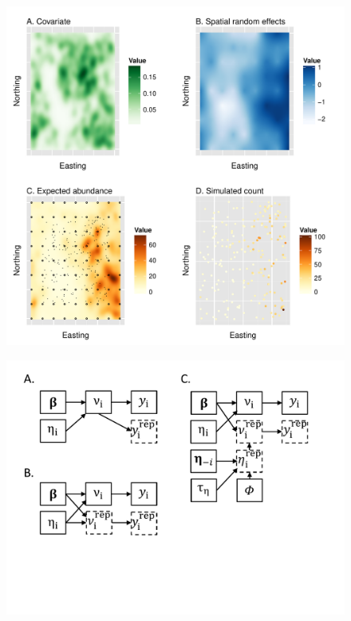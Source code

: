 \documentclass[12pt,english]{article}
\begin{document}
\begin{spacing}{1.9}
\begin{figure}
\begin{center}
\includegraphics[width=170mm]{sim_count_maps.pdf}
\caption{} \label{fig:sim_maps}
\end{center}
\end{figure}

\begin{figure}
\begin{center}
\includegraphics[width=170mm]{posterior_prediction_diagram.pdf}
\caption{} \label{fig:post_pred}
\end{center}
\end{figure}


\end{spacing}
\end{document}
